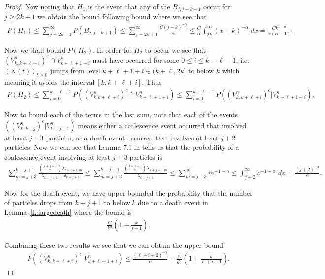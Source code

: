 \documentclass[11pt]{article}
\theoremstyle{definition}
\newcommand{\lemref}[1]{Lemma~\ref{L:#1}}
\begin{document}
\begin{proof}
    \noindent Now noting that $H_1$ is the event that any of the $B_{j,j-k+1}$ occur for $j \geq 2k+1$ we obtain the bound following bound where we see that
    \begin{align*}
        P(H_1) \leq \sum_{j = 2k+1}^\infty P(B_{j,j-k+1}) \leq \sum_{j = 2k+1}^\infty  \frac{C(j-k)^{-\alpha}}{\alpha} \leq \frac{C}{\alpha}\int_{2k}^\infty (x - k )^{-\alpha}\;dx = \frac{Ck^{1-\alpha}}{\alpha(\alpha - 1)}.
    \end{align*}
    
    \noindent Now we shall bound $P(H_2)$. In order for $H_2$ to occur we see that $(V_{k, k+\ell + i}^n)^c \cap V^n_{k+\ell + 1+ i}$ must have occurred for some $0 \leq i \leq k-\ell - 1$, i.e. $(X(t))_{t \geq 0}$ jumps from level $k+\ell + 1+ i \in (k+\ell, 2k]$ to below $k$ which meaning it avoids the interval $[k, k+\ell + i]$. Thus
    \begin{align*}
        P(H_2) \leq \sum_{i = 0}^{k-\ell -1} P((V_{k, k+\ell + i}^n)^c \cap V^n_{k+\ell + 1+ i}) \leq \sum_{i = 0}^{k-\ell - 1} P((V_{k, k+\ell + i}^n)^c | V^n_{k+\ell + 1+ i}).
    \end{align*}

    \noindent Now to bound each of the terms in the last sum, note that each of the events $((V_{k, k + j}^n)^c | V^n_{k + j+1})$ means either a coalescence event occurred that involved at least $j +3$ particles, or a death event occurred that involves at least $j + 2$ particles. Now we can see that Lemma 7.1 in \cite{betasmalltime} tells us that the probability of a coalescence event involving at least $j +3$ particles is
    \begin{align*}
        \sum_{m = j+3}^{k+j+1} \frac{\binom{k+j+1}{m}\lambda_{k+j+1, m}}{\lambda_{k+j+1} + d_{k+j+1}} \leq \sum_{m = j+3}^{k+j+1} \frac{\binom{k+j+1}{m}\lambda_{k+j+1, m}}{\lambda_{k+j+1}} \leq \sum_{m = j+3}^{\infty} m^{-1-\alpha} \leq \int_{j +2}^\infty x^{-1-\alpha}\;dx = \frac{(j+2)^{-\alpha}}{\alpha}.
    \end{align*}

    \noindent Now for the death event, we have upper bounded the probability that the number of particles drops from $k+j+1$ to below $k$ due to a death event in \lemref{largedeath} where the bound is
    \begin{align*}
        \frac{C}{k^\alpha}\left(1 + \frac{k}{j+1}\right).
    \end{align*}

    \noindent Combining these two results we see that we can obtain the upper bound
    \begin{align*}
        P((V_{k, k+\ell + i}^n)^c | V^n_{k+\ell + 1+ i}) \leq \frac{(\ell + i+2)^{-\alpha}}{\alpha} + \frac{C}{k^\alpha}\left(1 + \frac{k}{\ell + i+1}\right).
    \end{align*}
    

\end{proof}
\end{document}
